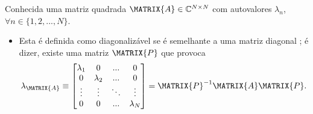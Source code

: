 \begin{definition}\label{def:diagonalization0}
Conhecida uma matriz quadrada $\MATRIX{A} \in \mathbb{C}^{N \times N}$ com
autovalores $\lambda_n$, $\forall n \in \{1, 2, ..., N\}$.
\begin{itemize}
\item Esta é definida como diagonalizável se é semelhante a uma matriz diagonal \cite[pp. 67]{golub2013matrix};
é dizer, existe uma matriz $\MATRIX{P}$ que provoca
\begin{equation}
\lambda_\MATRIX{A}\equiv
\begin{bmatrix}
\lambda_1 & 0         & ...    & 0 \\
0         & \lambda_2 & ...    & 0 \\
\vdots    & \vdots    & \ddots & \vdots \\
0         & 0         & ...    & \lambda_N
\end{bmatrix}
=\MATRIX{P}^{-1}\MATRIX{A}\MATRIX{P}.
\end{equation}
\end{itemize}
\end{definition}




